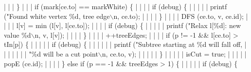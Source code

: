 {{\color[rgb]{0.8,0.8,0.8}| | | }\}\newline
{\color[rgb]{0.8,0.8,0.8}| | | }{\color[rgb]{0.4,0.4,0.0}if} (mark[ce.to] == markWhite) \{\newline
{\color[rgb]{0.8,0.8,0.8}| | | | }{\color[rgb]{0.4,0.4,0.0}if} (debug) \{\newline
{\color[rgb]{0.8,0.8,0.8}| | | | | }printf ({\color[rgb]{0.5,0.0,0.0}"Found white vertex \%d, tree edge$\backslash$n\textquotedbl}, ce.to);\newline
{\color[rgb]{0.8,0.8,0.8}| | | | }\}\newline
{\color[rgb]{0.8,0.8,0.8}| | | | }DFS (ce.to, v, ce.id);\newline
{\color[rgb]{0.8,0.8,0.8}| | | | }l[v] = min (l[v], l[ce.to]);\newline
{\color[rgb]{0.8,0.8,0.8}| | | | }{\color[rgb]{0.4,0.4,0.0}if} (debug) \{\newline
{\color[rgb]{0.8,0.8,0.8}| | | | | }printf ({\color[rgb]{0.5,0.0,0.0}"Relax l[\%d]: new value \%d$\backslash$n\textquotedbl}, v, l[v]);\newline
{\color[rgb]{0.8,0.8,0.8}| | | | }\}\newline
{\color[rgb]{0.8,0.8,0.8}| | | | }++treeEdges;\newline
{\color[rgb]{0.8,0.8,0.8}| | | | }{\color[rgb]{0.4,0.4,0.0}if} (p != {-}{\color[rgb]{0.0,0.0,0.5}1} \&\& l[ce.to] >{} tIn[p]) \{\newline
{\color[rgb]{0.8,0.8,0.8}| | | | | }{\color[rgb]{0.4,0.4,0.0}if} (debug) \{\newline
{\color[rgb]{0.8,0.8,0.8}| | | | | | }printf ({\color[rgb]{0.5,0.0,0.0}"Subtree starting at \%d will fall off, \textquotedbl}\newline
{\color[rgb]{0.8,0.8,0.8}| | | | | | | }{\color[rgb]{0.5,0.0,0.0}"\%d will be a cut point$\backslash$n\textquotedbl}, ce.to, v);\newline
{\color[rgb]{0.8,0.8,0.8}| | | | | }\}\newline
{\color[rgb]{0.8,0.8,0.8}| | | | | }isCut = {\color[rgb]{0.4,0.4,0.0}true};\newline
{\color[rgb]{0.8,0.8,0.8}| | | | | }popE (ce.id);\newline
{\color[rgb]{0.8,0.8,0.8}| | | | }\} {\color[rgb]{0.4,0.4,0.0}else} {\color[rgb]{0.4,0.4,0.0}if} (p == {-}{\color[rgb]{0.0,0.0,0.5}1} \&\& treeEdges >{} {\color[rgb]{0.0,0.0,0.5}1}) \{\newline
{\color[rgb]{0.8,0.8,0.8}| | | | | }{\color[rgb]{0.4,0.4,0.0}if} (debug) \{\newline
}
